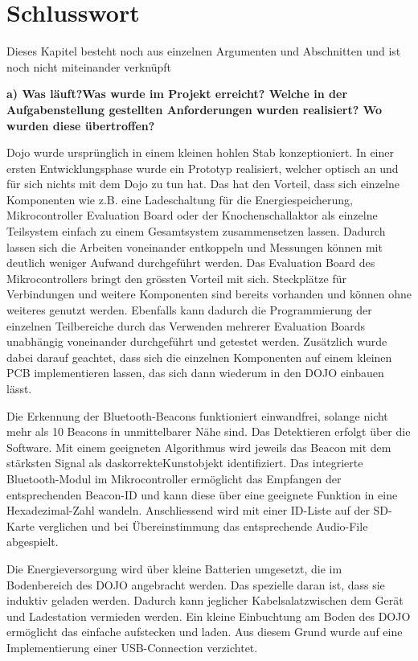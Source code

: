 \section{Schlusswort} \label{sec:schlusswort}

Dieses Kapitel besteht noch aus einzelnen Argumenten und Abschnitten und ist noch nicht miteinander verknüpft

\textbf{a) Was läuft?Was wurde im Projekt erreicht? Welche in der Aufgabenstellung gestellten Anforderungen wurden realisiert? Wo wurden diese übertroffen?}

Dojo wurde ursprünglich in einem kleinen hohlen Stab konzeptioniert. In einer ersten Entwicklungsphase wurde ein Prototyp realisiert, welcher optisch an und für sich nichts mit dem Dojo zu tun hat. Das hat den Vorteil, dass sich einzelne Komponenten wie z.B. eine Ladeschaltung für die Energiespeicherung, Mikrocontroller Evaluation Board oder der Knochenschallaktor als einzelne Teilsystem einfach zu einem Gesamtsystem zusammensetzen lassen. Dadurch lassen sich die Arbeiten voneinander entkoppeln und Messungen können mit deutlich weniger Aufwand durchgeführt werden. Das Evaluation Board des Mikrocontrollers bringt den grössten Vorteil mit sich. Steckplätze für Verbindungen und weitere Komponenten sind bereits vorhanden und können ohne weiteres genutzt werden. Ebenfalls kann dadurch die Programmierung der einzelnen Teilbereiche durch das Verwenden mehrerer Evaluation Boards unabhängig voneinander durchgeführt und getestet werden. Zusätzlich wurde dabei darauf geachtet, dass sich die einzelnen Komponenten auf einem kleinen PCB implementieren lassen, das sich dann wiederum in den DOJO einbauen lässt.

Die Erkennung der Bluetooth-Beacons funktioniert einwandfrei, solange nicht mehr als 10 Beacons in unmittelbarer Nähe sind. Das Detektieren erfolgt über die Software. Mit einem geeigneten Algorithmus wird jeweils das Beacon mit dem stärksten Signal als das\glqq korrekte\grqq Kunstobjekt identifiziert. Das integrierte Bluetooth-Modul im Mikrocontroller ermöglicht das Empfangen der entsprechenden Beacon-ID und kann diese über eine geeignete Funktion in eine Hexadezimal-Zahl wandeln. Anschliessend wird mit einer ID-Liste auf der SD-Karte verglichen und bei Übereinstimmung das entsprechende Audio-File abgespielt.

Die Energieversorgung wird über kleine Batterien umgesetzt, die im Bodenbereich des DOJO angebracht werden. Das spezielle daran ist, dass sie induktiv geladen werden. Dadurch kann jeglicher \glqq Kabelsalat\grqq zwischen dem Gerät und Ladestation vermieden werden. Ein kleine Einbuchtung am Boden des DOJO ermöglicht das einfache aufstecken und laden. Aus diesem Grund wurde auf eine Implementierung einer USB-Connection verzichtet.

